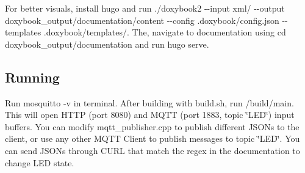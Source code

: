 For better visuals, install {\ttfamily hugo} and run {\ttfamily ./doxybook2 -\/-\/input xml/ -\/-\/output doxybook\+\_\+output/documentation/content -\/-\/config .doxybook/config.\+json -\/-\/templates .doxybook/templates/}. The, navigate to documentation using {\ttfamily cd doxybook\+\_\+output/documentation} and run {\ttfamily hugo serve}.

\subsection*{Running}

Run {\ttfamily mosquitto -\/v} in terminal. After building with build.\+sh, run /build/main. This will open H\+T\+TP (port 8080) and M\+Q\+TT (port 1883, topic \char`\"{}\+L\+E\+D\char`\"{}) input buffers. You can modify {\ttfamily mqtt\+\_\+publisher.\+cpp} to publish different J\+S\+O\+Ns to the client, or use any other M\+Q\+TT Client to publish messages to topic \char`\"{}\+L\+E\+D\char`\"{}. You can send J\+S\+O\+Ns through C\+U\+RL that match the regex in the documentation to change L\+ED state. 